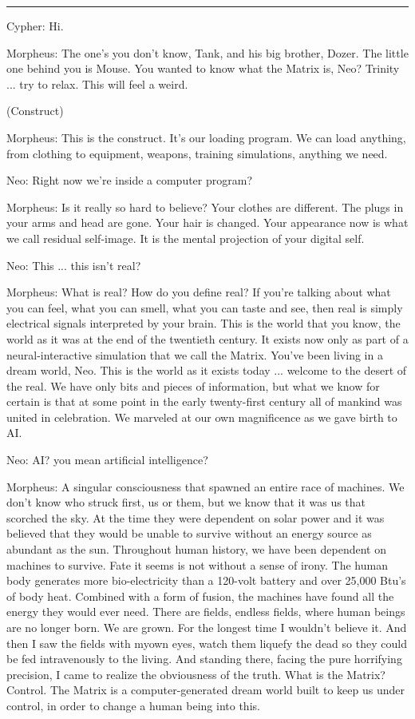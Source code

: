 \documentclass[UTF8]{ctexart}
\newcommand{\myparsep}{\noindent \rule[0.5ex]{\linewidth}{1pt}}
\newenvironment{myquote}{\color{green} \setlength{\leftskip}{6em} \setlength{\rightskip}{4em} \setlength{\parindent}{-2em}}{\par}
\begin{document}
\myparsep

\begin{myquote}
Cypher: Hi.

Morpheus: The one's you don't know, Tank, and his big brother, Dozer. The little one behind you is Mouse. You wanted to know what the Matrix is, Neo? Trinity ... try to relax. This will feel a weird.

(Construct)

Morpheus: This is the construct. It's our loading program. We can load anything, from clothing to equipment, weapons, training simulations, anything we need.

Neo: Right now we're inside a computer program?

Morpheus: Is it really so hard to believe? Your clothes are different. The plugs in your arms and head are gone. Your hair is changed. Your appearance now is what we call residual self-image. It is the mental projection of your digital self.

Neo: This ... this isn't real?

Morpheus: What is real? How do you define real? If you're talking about what you can feel, what you can smell, what you can taste and see, then real is simply electrical signals interpreted by your brain. This is the world that you know, the world as it was at the end of the twentieth century. It exists now only as part of a neural-interactive simulation that we call the Matrix. You've been living in a dream world, Neo. This is the world as it exists today ... welcome to the desert of the real. We have only bits and pieces of information, but what we know for certain is that at some point in the early twenty-first century all of mankind was united in celebration. We marveled at our own magnificence as we gave birth to AI.

Neo: AI? you mean artificial intelligence?

Morpheus: A singular consciousness that spawned an entire race of machines. We don't know who struck first, us or them, but we know that it was us that scorched the sky. At the time they were dependent on solar power and it was believed that they would be unable to survive without an energy source as abundant as the sun. Throughout human history, we have been dependent on machines to survive. Fate it seems is not without a sense of irony. The human body generates more bio-electricity than a 120-volt battery and over 25,000 Btu's of body heat. Combined with a form of fusion, the machines have found all the energy they would ever need. There are fields, endless fields, where human beings are no longer born. We are grown. For the longest time I wouldn't believe it. And then I saw the fields with myown eyes, watch them liquefy the dead so they could be fed intravenously to the living. And standing there, facing the pure horrifying precision, I came to realize the obviousness of the truth. What is the Matrix? Control. The Matrix is a computer-generated dream world built to keep us under control, in order to change a human being into this.


\end{myquote}
\end{document}
